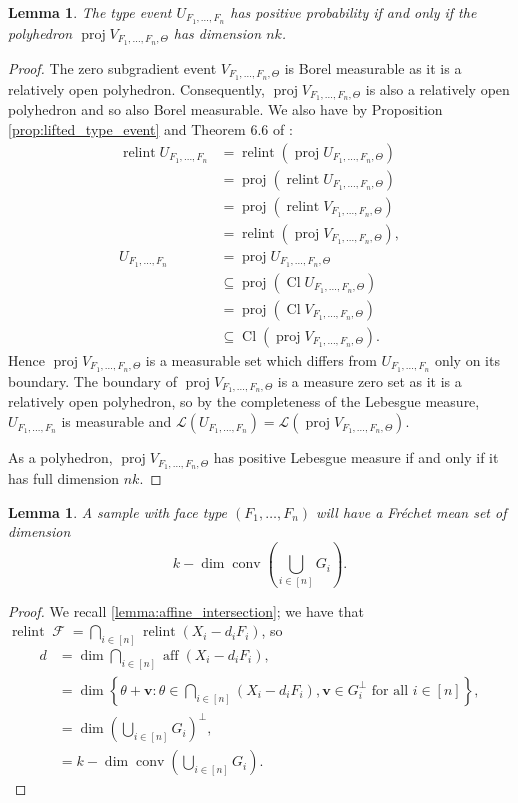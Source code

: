 \documentclass[10pt]{article}
\newtheorem{lemma}[theorem]{Lemma}
\theoremstyle{definition}
\theoremstyle{remark}
\renewcommand{\L}{\mathcal{L}}
\newcommand{\CType}{F_1,\dots,F_n}
\DeclareMathOperator{\conv}{conv}
\DeclareMathOperator{\relint}{relint}
\DeclareMathOperator{\closure}{Cl}
\DeclareMathOperator{\FMset}{\mathcal{F}}
\DeclareMathOperator{\aff}{aff}
\DeclareMathOperator{\proj}{proj}
\renewcommand{\vec}[1]{\mathbf{#1}}
\begin{document}
	\begin{lemma}\label{lemma:probable}
		The type event $U_{\CType}$ has positive probability if and only if the polyhedron $\proj V_{\CType,\Theta}$ has dimension $nk$.
	\end{lemma}
	
	\begin{proof}
		The zero subgradient event $V_{\CType,\Theta}$ is Borel measurable as it is a relatively open polyhedron. Consequently, $\proj V_{\CType,\Theta}$ is also a relatively open polyhedron and so also Borel measurable.
		We also have by Proposition \ref{prop:lifted_type_event} and Theorem 6.6 of \cite{rockafellar1970convex}:
		\begin{align*}
			\relint U_{\CType} &= \relint (\proj U_{\CType,\Theta})\\
			&= \proj (\relint U_{\CType,\Theta}) \\
			&= \proj (\relint V_{\CType,\Theta}) \\
			&= \relint (\proj V_{\CType,\Theta}),\\
			U_{\CType} &= \proj U_{\CType,\Theta} \\
			&\subseteq \proj (\closure U_{\CType,\Theta}) \\
			&= \proj (\closure V_{\CType,\Theta}) \\
			&\subseteq \closure (\proj V_{\CType,\Theta}).
		\end{align*}
		Hence $\proj V_{\CType,\Theta}$ is a measurable set which differs from $U_{\CType}$ only on its boundary. The boundary of $\proj V_{\CType,\Theta}$ is a measure zero set as it is a relatively open polyhedron, so by the completeness of the Lebesgue measure, $U_{\CType}$ is measurable and $\L(U_{\CType}) = \L(\proj V_{\CType,\Theta})$.
		
		As a polyhedron, $\proj V_{\CType,\Theta}$ has positive Lebesgue measure if and only if it has full dimension $nk$. 
	\end{proof}
	
	
	\begin{lemma} \label{lemma:unique}
		A sample with face type $(\CType)$ will have a Fr\'echet mean set of dimension $$k - \dim \conv \left(\textstyle \bigcup_{i \in [n]} G_i \right).$$ 
	\end{lemma}
	
	\begin{proof}
		We recall \cref{lemma:affine_intersection}; we have that $\relint \FMset = \bigcap_{i \in [n]} \relint (X_i - d_i F_i)$, so
		\begin{align}
			d  &= \dim \textstyle\bigcap_{i \in [n]} \aff (X_i - d_i F_i), \nonumber\\
			&=\dim \left\{ \theta + \vec v : \theta \in \textstyle\bigcap_{i \in [n]} (X_i - d_i F_i), \vec v \in G_i^{\perp} \text{ for all }i \in [n] \right\}, \nonumber\\
			&=\dim \left(\textstyle \bigcup_{i \in [n]} G_i \right)^{\perp}, \nonumber\\
			&=k - \dim \conv \left(\textstyle \bigcup_{i \in [n]} G_i \right). \label{eq:expr_for_d}
		\end{align}
	\end{proof}
	
\end{document}
